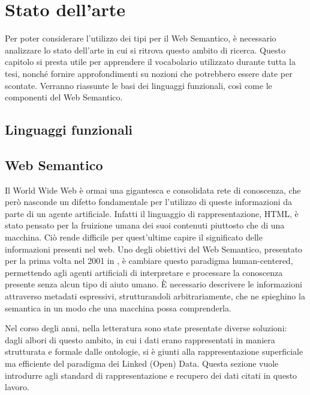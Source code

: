 \chapter[Stato dell'arte]{Stato dell'arte}
Per poter considerare l'utilizzo dei tipi per il Web Semantico, è necessario analizzare lo stato dell'arte in cui si ritrova questo ambito di ricerca.
Questo capitolo si presta utile per apprendere il vocabolario utilizzato durante tutta la tesi, nonché fornire approfondimenti su nozioni che potrebbero essere date per scontate.
Verranno riassunte le basi dei linguaggi funzionali, così come le componenti del Web Semantico.
\section[Linguaggi funzionali]{Linguaggi funzionali}
\section[Web Semantico]{Web Semantico}
Il World Wide Web è ormai una gigantesca e consolidata rete di conoscenza, che però nasconde un difetto fondamentale per l'utilizzo di queste informazioni da parte di un agente artificiale. Infatti il linguaggio di rappresentazione, HTML, è stato pensato per la fruizione umana dei suoi contenuti piuttosto che di una macchina. Ciò rende difficile per quest'ultime capire il significato delle informazioni presenti nel web. Uno degli obiettivi del Web Semantico, presentato per la prima volta nel 2001 in \cite{berners2001semantic}, è cambiare questo paradigma human-centered, permettendo agli agenti artificiali di interpretare e processare la conoscenza presente senza alcun tipo di aiuto umano. È necessario descrivere le informazioni attraverso metadati espressivi, strutturandoli arbitrariamente, che ne spieghino la semantica in un modo che una macchina possa comprenderla.

Nel corso degli anni, nella letteratura sono state presentate diverse soluzioni: dagli albori di questo ambito, in cui i dati erano rappresentati in maniera strutturata e formale dalle ontologie, si è giunti alla rappresentazione superficiale ma efficiente del paradigma dei Linked (Open) Data. Questa sezione vuole introdurre agli standard di rappresentazione e recupero dei dati citati in questo lavoro.

